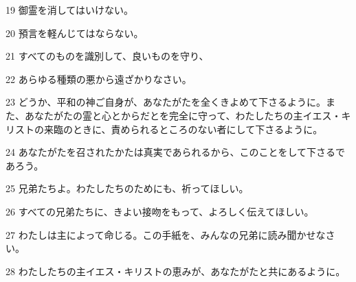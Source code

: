 \par 19 御霊を消してはいけない。
\par 20 預言を軽んじてはならない。
\par 21 すべてのものを識別して、良いものを守り、
\par 22 あらゆる種類の悪から遠ざかりなさい。
\par 23 どうか、平和の神ご自身が、あなたがたを全くきよめて下さるように。また、あなたがたの霊と心とからだとを完全に守って、わたしたちの主イエス・キリストの来臨のときに、責められるところのない者にして下さるように。
\par 24 あなたがたを召されたかたは真実であられるから、このことをして下さるであろう。
\par 25 兄弟たちよ。わたしたちのためにも、祈ってほしい。
\par 26 すべての兄弟たちに、きよい接吻をもって、よろしく伝えてほしい。
\par 27 わたしは主によって命じる。この手紙を、みんなの兄弟に読み聞かせなさい。
\par 28 わたしたちの主イエス・キリストの恵みが、あなたがたと共にあるように。


